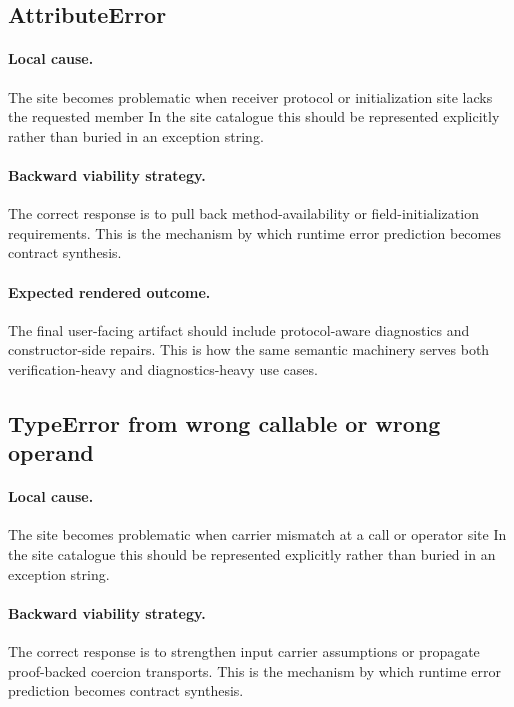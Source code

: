 \documentclass[11pt]{report}
\theoremstyle{definition}
\theoremstyle{plain}
\begin{document}
\subsection{AttributeError}

\paragraph{Local cause.}
The site becomes problematic when receiver protocol or initialization site lacks the requested member In the site catalogue this should be
represented explicitly rather than buried in an exception string.

\paragraph{Backward viability strategy.}
The correct response is to pull back method-availability or field-initialization requirements. This is the mechanism by which runtime
error prediction becomes contract synthesis.

\paragraph{Expected rendered outcome.}
The final user-facing artifact should include protocol-aware diagnostics and constructor-side repairs. This is how the same
semantic machinery serves both verification-heavy and diagnostics-heavy use
cases.

\subsection{TypeError from wrong callable or wrong operand}

\paragraph{Local cause.}
The site becomes problematic when carrier mismatch at a call or operator site In the site catalogue this should be
represented explicitly rather than buried in an exception string.

\paragraph{Backward viability strategy.}
The correct response is to strengthen input carrier assumptions or propagate proof-backed coercion transports. This is the mechanism by which runtime
error prediction becomes contract synthesis.
\end{document}
